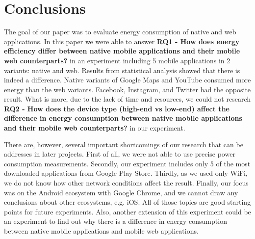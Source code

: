 \section{Conclusions}\label{sec:conclusions}
The goal of our paper was to evaluate energy consumption of native and web applications. In this paper we were able to answer \textbf{RQ1 - How does energy efficiency differ between native mobile applications and their mobile web counterparts?} in an experiment including 5 mobile applications in 2 variants: native and web. Results from statistical analysis showed that there is indeed a difference. Native variants of Google Maps and YouTube consumed more energy than the web variants. Facebook, Instagram, and Twitter had the opposite result.  What is more, due to the lack of time and resources, we could not research \textbf{RQ2 - How does the device type (high-end vs low-end) affect the difference in energy consumption between native mobile applications and their mobile web counterparts?} in our experiment.%

There are, however, several important shortcomings of our research that can be addresses in later projects. First of all, we were not able to use precise power consumption measurements. Secondly, our experiment includes only 5 of the most downloaded applications from Google Play Store. Thirdly, as we used only WiFi, we do not know how other network conditions affect the result. Finally, our focus was on the Android ecosystem with Google Chrome, and we cannot draw any conclusions about other ecosystems, e.g. iOS. All of those topics are good starting points for future experiments. Also, another extension of this experiment could be an experiment to find out why there is a difference in energy consumption between native mobile applications and mobile web applications.
 

